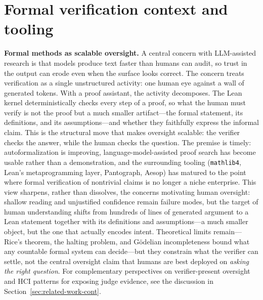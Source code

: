 \documentclass{article}
\begin{document}
\section{Formal verification context and tooling}
\textbf{Formal methods as scalable oversight.}
A central concern with LLM-assisted research is that models produce text faster than humans can audit, so trust in the output can erode even when the surface looks correct.
The concern treats verification as a single unstructured activity: one human eye against a wall of generated tokens.
With a proof assistant, the activity decomposes.
The Lean kernel deterministically checks every step of a proof, so what the human must verify is not the proof but a much smaller artifact---the formal statement, its definitions, and its assumptions---and whether they faithfully express the informal claim.
This is the structural move that makes oversight scalable: the verifier checks the answer, while the human checks the question.
The premise is timely: autoformalization is improving, language-model-assisted proof search has become usable rather than a demonstration, and the surrounding tooling (\texttt{mathlib4}, Lean's metaprogramming layer, Pantograph, Aesop) has matured to the point where formal verification of nontrivial claims is no longer a niche enterprise.
This view sharpens, rather than dissolves, the concerns motivating human oversight: shallow reading and unjustified confidence remain failure modes, but the target of human understanding shifts from hundreds of lines of generated argument to a Lean statement together with its definitions and assumptions---a much smaller object, but the one that actually encodes intent.
Theoretical limits remain---Rice's theorem, the halting problem, and G\"odelian incompleteness bound what any countable formal system can decide---but they constrain what the verifier can settle, not the central oversight claim that humans are best deployed on \emph{asking the right question}.
For complementary perspectives on verifier-present oversight and HCI patterns for exposing judge evidence, see the discussion in Section~\ref{sec:related-work-cont}.
\end{document}
